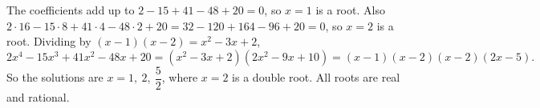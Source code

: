 The coefficients add up to $2-15+41-48+20=0$, so $x=1$ is a root. Also $2\cdot16-15\cdot8+41\cdot4-48\cdot2+20=32-120+164-96+20=0$, so $x=2$ is a root. Dividing by $(x-1)(x-2)=x^2-3x+2$,
\[
2x^4-15x^3+41x^2-48x+20=(x^2-3x+2)(2x^2-9x+10)=(x-1)(x-2)(x-2)(2x-5).
\]
So the solutions are $\boxed{x=1,\ 2,\ \dfrac{5}{2}}$, where $x=2$ is a double root. All roots are real and rational.
